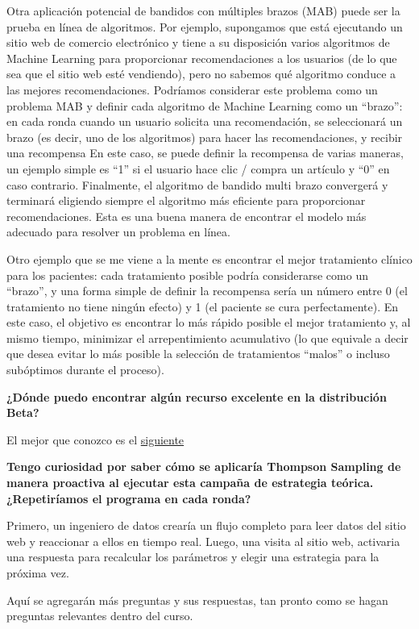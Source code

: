 \documentclass[
]{book}
\begin{document}
Otra aplicación potencial de bandidos con múltiples brazos (MAB) puede ser la prueba en línea de algoritmos. Por ejemplo, supongamos que está ejecutando un sitio web de comercio electrónico y tiene a su disposición varios algoritmos de Machine Learning para proporcionar recomendaciones a los usuarios (de lo que sea que el sitio web esté vendiendo), pero no sabemos qué algoritmo conduce a las mejores recomendaciones. Podríamos considerar este problema como un problema MAB y definir cada algoritmo de Machine Learning como un ``brazo'': en cada ronda cuando un usuario solicita una recomendación, se seleccionará un brazo (es decir, uno de los algoritmos) para hacer las recomendaciones, y recibir una recompensa En este caso, se puede definir la recompensa de varias maneras, un ejemplo simple es ``1'' si el usuario hace clic / compra un artículo y ``0'' en caso contrario. Finalmente, el algoritmo de bandido multi brazo convergerá y terminará eligiendo siempre el algoritmo más eficiente para proporcionar recomendaciones. Esta es una buena manera de encontrar el modelo más adecuado para resolver un problema en línea.

Otro ejemplo que se me viene a la mente es encontrar el mejor tratamiento clínico para los pacientes: cada tratamiento posible podría considerarse como un ``brazo'', y una forma simple de definir la recompensa sería un número entre 0 (el tratamiento no tiene ningún efecto) y 1 (el paciente se cura perfectamente). En este caso, el objetivo es encontrar lo más rápido posible el mejor tratamiento y, al mismo tiempo, minimizar el arrepentimiento acumulativo (lo que equivale a decir que desea evitar lo más posible la selección de tratamientos ``malos'' o incluso subóptimos durante el proceso).

\textbf{¿Dónde puedo encontrar algún recurso excelente en la distribución Beta?}

El mejor que conozco es el \href{https://stats.stackexchange.com/questions/47771/what-is-the-intuition-behind-beta-distribution}{siguiente}

\textbf{Tengo curiosidad por saber cómo se aplicaría Thompson Sampling de manera proactiva al ejecutar esta campaña de estrategia teórica. ¿Repetiríamos el programa en cada ronda?}

Primero, un ingeniero de datos crearía un flujo completo para leer datos del sitio web y reaccionar a ellos en tiempo real. Luego, una visita al sitio web, activaria una respuesta para recalcular los parámetros y elegir una estrategia para la próxima vez.

Aquí se agregarán más preguntas y sus respuestas, tan pronto como se hagan preguntas relevantes dentro del curso.

  
\end{document}
